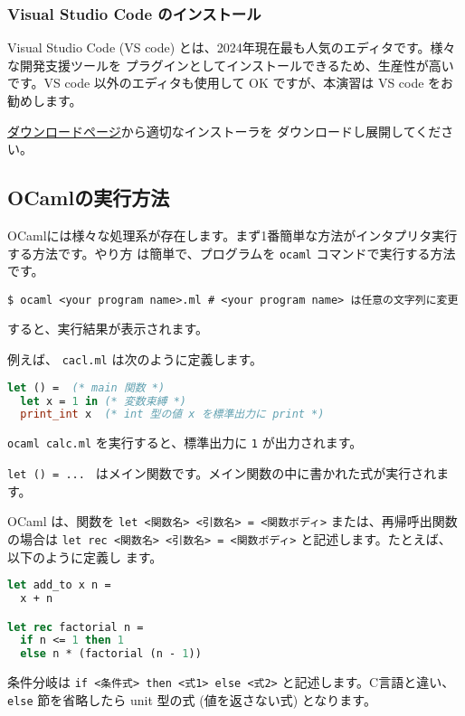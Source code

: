 \documentclass[a4paper,11pt]{jsarticle}
\begin{document}
\subsubsection{Visual Studio Code のインストール}

Visual Studio Code (VS code) とは、2024年現在最も人気のエディタです。様々な開発支援ツールを
プラグインとしてインストールできるため、生産性が高いです。VS code 以外のエディタも使用して
OK ですが、本演習は VS code をお勧めします。

\href{https://code.visualstudio.com/download}{ダウンロードページ}から適切なインストーラを
ダウンロードし展開してください。

\subsection{OCamlの実行方法}

OCamlには様々な処理系が存在します。まず1番簡単な方法がインタプリタ実行する方法です。やり方
は簡単で、プログラムを \verb|ocaml| コマンドで実行する方法です。

\begin{lstlisting}
$ ocaml <your program name>.ml # <your program name> は任意の文字列に変更
\end{lstlisting}

すると、実行結果が表示されます。

例えば、 \verb|cacl.ml| は次のように定義します。

\begin{lstlisting}[language=Caml]
let () =  (* main 関数 *)
  let x = 1 in (* 変数束縛 *)
  print_int x  (* int 型の値 x を標準出力に print *)
\end{lstlisting}

\verb|ocaml calc.ml| を実行すると、標準出力に \verb|1| が出力されます。

\verb|let () = ... | はメイン関数です。メイン関数の中に書かれた式が実行されます。

OCaml は、関数を \verb|let <関数名> <引数名> = <関数ボディ>| または、再帰呼出関数の場合は
\verb|let rec <関数名> <引数名> = <関数ボディ>| と記述します。たとえば、以下のように定義し
ます。

\begin{lstlisting}[language=Caml]
let add_to x n =
  x + n

let rec factorial n =
  if n <= 1 then 1
  else n * (factorial (n - 1))
\end{lstlisting}

条件分岐は \verb|if <条件式> then <式1> else <式2>| と記述します。C言語と違い、\verb|else|
節を省略したら unit 型の式 (値を返さない式) となります。
\end{document}
